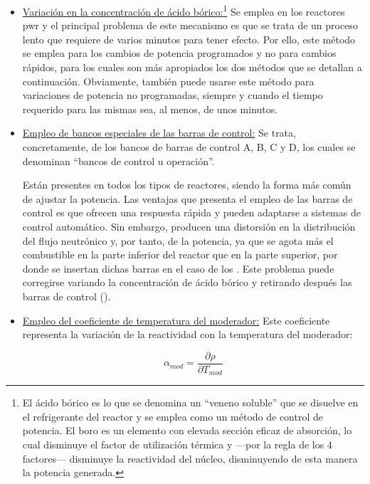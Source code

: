 \begin{itemize}
  \item \underline{Variación en la concentración de ácido bórico:}\footnote{El ácido bórico es lo que se denomina un ``veneno soluble'' que se disuelve en el refrigerante del reactor y se emplea como un método de control de potencia. El boro es un elemento con elevada sección eficaz de absorción, lo cual disminuye el factor de utilización térmica y ---por la regla de los 4 factores--- disminuye la \gls{reactividad} del núcleo, disminuyendo de esta manera la potencia generada.} Se emplea en los reactores \acrshort{pwr} y el principal problema de este mecanismo es que se trata de un proceso lento que requiere de varios minutos para tener efecto. Por ello, este método se emplea para los cambios de potencia programados y no para cambios rápidos, para los cuales son más apropiados los dos métodos que se detallan a continuación. Obviamente, también puede usarse este método para variaciones de potencia no programadas, siempre y cuando el tiempo requerido para las mismas sea, al menos, de unos minutos.
  
  \item \underline{Empleo de bancos especiales de las barras de control:} 
  Se trata, concretamente, de los bancos de barras de control A, B, C y D, los cuales se denominan ``bancos de control u operación''.

  Están presentes en todos los tipos de reactores, siendo la forma más común de ajustar la potencia. Las ventajas que presenta el empleo de las barras de control es que ofrecen una respuesta rápida y pueden adaptarse a sistemas de control automático. Sin embargo, producen una distorsión en la distribución del flujo neutrónico y, por tanto, de la potencia, ya que se agota más el combustible en la parte inferior del reactor que en la parte superior, por donde se insertan dichas barras en el caso de los . Este problema puede corregirse variando la concentración de ácido bórico y retirando después las barras de control (\cite{apuntes_centrales}).

  \item \underline{Empleo del coeficiente de temperatura del moderador:} Este coeficiente representa la variación de la \gls{reactividad} con la temperatura del moderador: 
  
  \begin{equation}
    \alpha_{mod}=\frac{\partial \rho}{\partial T_{mod}}
  \end{equation}


\end{itemize}
